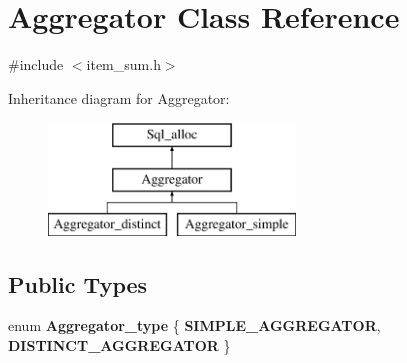 \hypertarget{classAggregator}{}\section{Aggregator Class Reference}
\label{classAggregator}


{\ttfamily \#include $<$item\+\_\+sum.\+h$>$}

Inheritance diagram for Aggregator\+:\begin{figure}[H]
\begin{center}
\leavevmode
\includegraphics[height=3.000000cm]{classAggregator}
\end{center}
\end{figure}
\subsection*{Public Types}
\begin{DoxyCompactItemize}
\item 
\mbox{\label{classAggregator_a61b988705710055ea031d1c227b43d05}} 
enum {\bfseries Aggregator\+\_\+type} \{ {\bfseries S\+I\+M\+P\+L\+E\+\_\+\+A\+G\+G\+R\+E\+G\+A\+T\+OR}, 
{\bfseries D\+I\+S\+T\+I\+N\+C\+T\+\_\+\+A\+G\+G\+R\+E\+G\+A\+T\+OR}
 \}
\end{DoxyCompactItemize}
